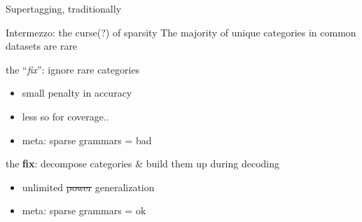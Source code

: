 \documentclass{beamer}
\begin{document}
\begin{frame}{Supertagging, traditionally}
{
    }
\end{frame}

\begin{frame}{Intermezzo: the curse(?) of sparsity}
    \smaller
    The majority of unique categories in common datasets are \alert{rare}
    \vfill

    \pause
    the ``\textit{fix}'': ignore rare categories
    \begin{itemize}
        \item small penalty in accuracy
        \item less so for coverage..
        \item meta: sparse grammars = bad
    \end{itemize}
    
    \vfill
    
    \pause
    the \textbf{fix}: decompose categories \& build them up during decoding
    \begin{itemize}
        \item[\textcolor{blue}{\lightning}] unlimited \sout{power} generalization
        \item meta: sparse grammars = ok
    \end{itemize}
\end{frame}
\end{document}
